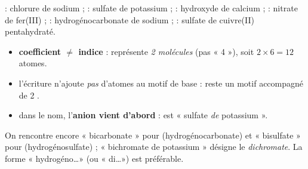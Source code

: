 \documentclass[11pt,a4paper]{article}
\begin{document}
\begin{exemplebox}
 : chlorure de sodium ;  : sulfate de potassium ;  : hydroxyde de
calcium ;  : nitrate de fer(III) ;  : hydrogénocarbonate de sodium ;
 : sulfate de cuivre(II) pentahydraté.
\end{exemplebox}

\begin{piege}
\begin{itemize}[leftmargin=1.4em,topsep=2pt,itemsep=1pt]
  \item \textbf{coefficient $\neq$ indice} :  représente \emph{2 molécules} (pas « 4 »), soit
        $2\times6=12$ atomes.
  \item l'écriture  n'ajoute \emph{pas} d'atomes au motif de base :  reste
        un motif  accompagné de 2 .
  \item dans le nom, l'\textbf{anion vient d'abord} :  est « sulfate \emph{de} potassium ».
\end{itemize}
\end{piege}

\begin{remarque}
On rencontre encore « bicarbonate » pour  (hydrogénocarbonate) et « bisulfate » pour 
(hydrogénosulfate) ; « bichromate de potassium »  désigne le \emph{dichromate}. La forme
« hydrogéno\ldots » (ou « di\ldots ») est préférable.
\end{remarque}
\end{document}
